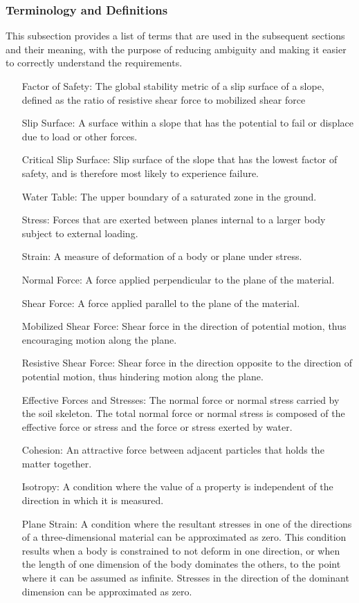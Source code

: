 \documentclass[12pt]{article}
\begin{document}
\subsubsection{Terminology and Definitions}
\label{Sec:TermDefs}
This subsection provides a list of terms that are used in the subsequent sections and their meaning, with the purpose of reducing ambiguity and making it easier to correctly understand the requirements.
\begin{itemize}
\item[Factor of Safety:]The global stability metric of a slip surface of a slope, defined as the ratio of resistive shear force to mobilized shear force
\item[Slip Surface:]A surface within a slope that has the potential to fail or displace due to load or other forces.
\item[Critical Slip Surface:]Slip surface of the slope that has the lowest factor of safety, and is therefore most likely to experience failure.
\item[Water Table:]The upper boundary of a saturated zone in the ground.
\item[Stress:]Forces that are exerted between planes internal to a larger body subject to external loading.
\item[Strain:]A measure of deformation of a body or plane under stress.
\item[Normal Force:]A force applied perpendicular to the plane of the material.
\item[Shear Force:]A force applied parallel to the plane of the material.
\item[Mobilized Shear Force:]Shear force in the direction of potential motion, thus encouraging motion along the plane.
\item[Resistive Shear Force:]Shear force in the direction opposite to the direction of potential motion, thus hindering motion along the plane.
\item[Effective Forces and Stresses:]The normal force or normal stress carried by the soil skeleton. The total normal force or normal stress is composed of the effective force or stress and the force or stress exerted by water.
\item[Cohesion:]An attractive force between adjacent particles that holds the matter together.
\item[Isotropy:]A condition where the value of a property is independent of the direction in which it is measured.
\item[Plane Strain:]A condition where the resultant stresses in one of the directions of a  three-dimensional material can be approximated as zero. This condition results when a body is constrained to not deform in one direction, or when the length of one dimension of the body dominates the others, to the point where it can be assumed as infinite. Stresses in the direction of the dominant dimension can be approximated as zero.
\end{itemize}
\end{document}

